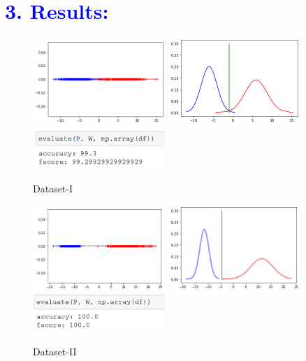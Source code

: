\documentclass[a4paper,10pt,twoside]{article}
\begin{document}
\newpage
\section*{\textcolor{blue}{3. Results:}}
\begin{figure}[h!]
\centering
\includegraphics[scale=1.0, width=5cm]{Fig1.png}
\includegraphics[scale=1.0, width=5cm]{Fig2.png}
\includegraphics[scale=1.0, width=5cm]{Fig11.png}
\caption{Dataset-I}
\end{figure}

\begin{figure}[h!]
\centering
\includegraphics[scale=1.0, width=5cm]{Fig3.png}
\includegraphics[scale=1.0, width=5cm]{Fig4.png}
\includegraphics[scale=1.0, width=5cm]{Fig21.png}
\caption{Dataset-II}
\end{figure}
\end{document}
